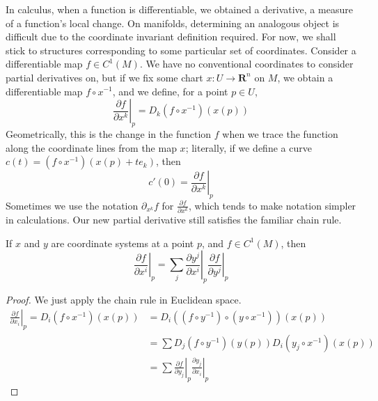 In calculus, when a function is differentiable, we obtained a derivative, a measure of a function's local change. On manifolds, determining an analogous object is difficult due to the coordinate invariant definition required. For now, we shall stick to structures corresponding to some particular set of coordinates. Consider a differentiable map $f \in C^1(M)$. We have no conventional coordinates to consider partial derivatives on, but if we fix some chart $x:U \to \mathbf{R}^n$ on $M$, we obtain a differentiable map $f \circ x^{-1}$, and we define, for a point $p \in U$,
%
\[ \left. \frac{\partial f}{\partial x^k} \right|_p = D_k(f \circ x^{-1})(x(p)) \]
%
Geometrically, this is the change in the function $f$ when we trace the function along the coordinate lines from the map $x$; literally, if we define a curve $c(t) = (f \circ x^{-1})(x(p) + te_k)$, then
%
\[ c'(0) = \left.\frac{\partial f}{\partial x^k}\right|_p \]
%
Sometimes we use the notation $\partial_{x^k} f$ for $\frac{\partial f}{\partial x^k}$, which tends to make notation simpler in calculations. Our new partial derivative still satisfies the familiar chain rule.

\begin{theorem}
    If $x$ and $y$ are coordinate systems at a point $p$, and $f \in C^1(M)$, then
    \[ \left. \frac{\partial f}{\partial x^i} \right|_p = \sum_j \left. \frac{\partial y^j}{\partial x^i} \right|_p \left. \frac{\partial f}{\partial y^j} \right|_p \]
\end{theorem}
\begin{proof}
    We just apply the chain rule in Euclidean space.
    \begin{align*}
        \left.\frac{\partial f}{\partial x_i}\right|_p = D_i(f \circ x^{-1})(x(p)) &= D_i((f \circ y^{-1}) \circ (y \circ x^{-1}))(x(p))\\
        &= \sum D_j(f \circ y^{-1})(y(p)) D_i(y_j \circ x^{-1})(x(p))\\
        &= \sum \left.\frac{\partial f}{\partial y_j}\right|_p \left.\frac{\partial y_j}{\partial x_i}\right|_p
    \end{align*}
\end{proof}

